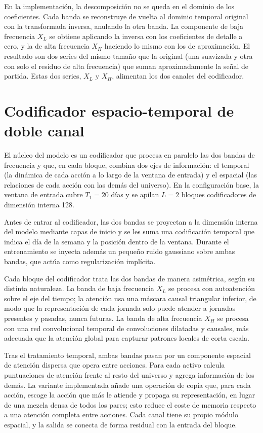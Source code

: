 En la implementación, la descomposición no se queda en el dominio de los coeficientes.
Cada banda se reconstruye de vuelta al dominio temporal original con la transformada
inversa, anulando la otra banda. La componente de baja frecuencia $X_L$ se obtiene
aplicando la inversa con los coeficientes de detalle a cero, y la de alta frecuencia $X_H$
haciendo lo mismo con los de aproximación. El resultado son dos series del mismo tamaño
que la original (una suavizada y otra con solo el residuo de alta frecuencia) que suman
aproximadamente la señal de partida. Estas dos series, $X_L$ y $X_H$, alimentan los dos
canales del codificador.

\section{Codificador espacio-temporal de doble canal}\label{sec:encoder}

El núcleo del modelo es un codificador que procesa en paralelo las dos bandas de
frecuencia y que, en cada bloque, combina dos ejes de información: el temporal (la
dinámica de cada acción a lo largo de la ventana de entrada) y el espacial (las relaciones
de cada acción con las demás del universo). En la configuración base, la ventana de
entrada cubre $T_1=20$ días y se apilan $L=2$ bloques codificadores de dimensión
interna 128.

Antes de entrar al codificador, las dos bandas se proyectan a la dimensión interna del
modelo mediante capas de inicio y se les suma una codificación temporal que indica
el día de la semana y la posición dentro de la ventana. Durante el entrenamiento se
inyecta además un pequeño ruido gaussiano sobre ambas bandas, que actúa como
regularización implícita.

Cada bloque del codificador trata las dos bandas de manera asimétrica, según su distinta
naturaleza. La banda de baja frecuencia $X_L$ se procesa con autoatención sobre el eje del
tiempo; la atención usa una máscara causal triangular inferior, de modo que la
representación de cada jornada solo puede atender a jornadas presentes y pasadas, nunca
futuras. La banda de alta frecuencia $X_H$ se procesa con una red convolucional temporal
de convoluciones dilatadas y causales, más adecuada que la atención global para capturar
patrones locales de corta escala.

Tras el tratamiento temporal, ambas bandas pasan por un componente espacial de atención
dispersa que opera entre acciones. Para cada activo calcula puntuaciones de atención
frente al resto del universo y agrega información de los demás. La variante implementada
añade una operación de copia que, para cada acción, escoge la acción que más le atiende y
propaga su representación, en lugar de una mezcla densa de todos los pares; esto reduce el
coste de memoria respecto a una atención completa entre acciones. Cada canal tiene su
propio módulo espacial, y la salida se conecta de forma residual con la entrada del
bloque.

